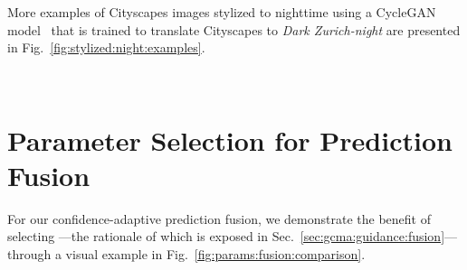 \documentclass[10pt,twocolumn,letterpaper]{article}
\begin{document}
More examples of Cityscapes images stylized to nighttime using a CycleGAN model~\cite{cycleGAN} that is trained to translate Cityscapes to \emph{Dark Zurich-night} are presented in Fig.~\ref{fig:stylized:night:examples}.

\begin{figure*}[!tb]
    \centering
    \hfil
    \hfil
    \hfil
    \\
    \hfil
    \hfil
    \hfil
    \caption{Top row: Examples of images from Cityscapes ( in GCMA), bottom row: corresponding images from Cityscapes-nighttime style ( in GCMA).}
    \label{fig:stylized:night:examples}
\end{figure*}

\section{Parameter Selection for Prediction Fusion}
\label{supp:sec:params:fusion}

For our confidence-adaptive prediction fusion, we demonstrate the benefit of selecting ---the rationale of which is exposed in Sec.~\ref{sec:gcma:guidance:fusion}---through a visual example in Fig.~\ref{fig:params:fusion:comparison}.
\end{document}
